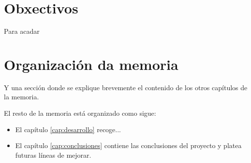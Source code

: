  \section{Obxectivos}
Para acadar 

\section{Organización da memoria}
Y una sección donde se explique brevemente el contenido de los otros capítulos de la memoria. 

El resto de la memoria está organizado como sigue:
\begin{itemize}
\item El capítulo  \ref{cap:desarrollo} recoge...
\item El capítulo \ref{cap:conclusiones} contiene las conclusiones del proyecto y platea futuras líneas de mejorar.
\end{itemize}
